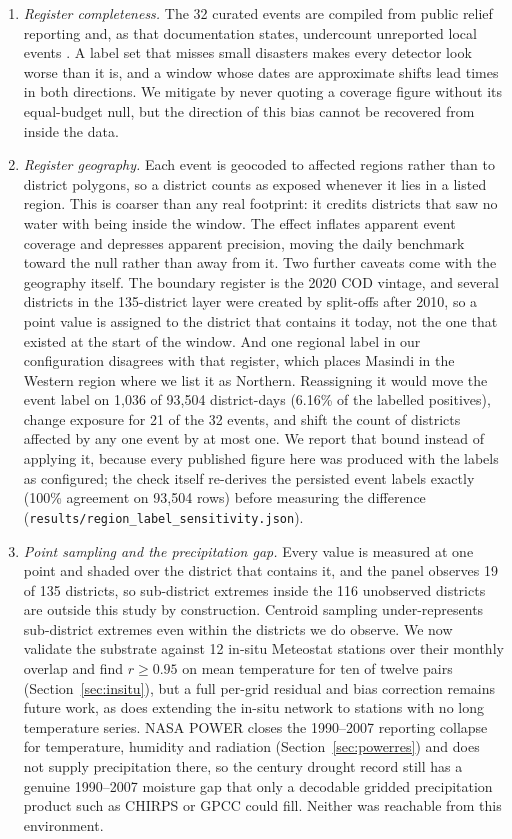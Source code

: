 \documentclass[preprint,12pt]{elsarticle}
\begin{document}
\begin{enumerate}
\item \emph{Register completeness.} The 32 curated events are compiled from public
relief reporting and, as that documentation states, undercount unreported local
events \cite{emdatdoc}. A label set that misses small disasters makes every
detector look worse than it is, and a window whose dates are approximate shifts
lead times in both directions. We mitigate by never quoting a coverage figure
without its equal-budget null, but the direction of this bias cannot be recovered
from inside the data.

\item \emph{Register geography.} Each event is geocoded to affected regions rather
than to district polygons, so a district counts as exposed whenever it lies in a
listed region. This is coarser than any real footprint: it credits districts that
saw no water with being inside the window. The effect inflates apparent event
coverage and depresses apparent precision, moving the daily benchmark toward the
null rather than away from it. Two further caveats come with the geography
itself. The boundary register is the 2020 COD vintage, and several districts in
the 135-district layer were created by split-offs after 2010, so a point value
is assigned to the district that contains it today, not the one that existed at
the start of the window. And one regional label in our configuration disagrees
with that register, which places Masindi in the Western region where we list it
as Northern. Reassigning it would move the event label on 1{,}036 of 93{,}504
district-days (6.16\% of the labelled positives), change exposure for 21 of the
32 events, and shift the count of districts affected by any one event by at most
one. We report that bound instead of applying it, because every published figure
here was produced with the labels as configured; the check itself re-derives the
persisted event labels exactly (100\% agreement on 93{,}504 rows) before
measuring the difference
(\texttt{results/region\_label\_sensitivity.json}).

\item \emph{Point sampling and the precipitation gap.} Every value is measured at
one point and shaded over the district that contains it, and the panel observes
19 of 135 districts, so sub-district extremes inside the 116 unobserved
districts are outside this study by construction. Centroid sampling
under-represents sub-district extremes even within the districts we do observe.
We now validate the substrate against 12
in-situ Meteostat stations over their monthly overlap and find $r\geq0.95$ on mean
temperature for ten of twelve pairs (Section~\ref{sec:insitu}), but a full per-grid
residual and bias correction remains future work, as does extending the in-situ
network to stations with no long temperature series. NASA POWER closes the
1990--2007 reporting collapse for temperature, humidity and radiation
(Section~\ref{sec:powerres}) and does not supply precipitation there, so the
century drought record still has a genuine 1990--2007 moisture gap that only a
decodable gridded precipitation product such as CHIRPS \cite{funk2015} or GPCC
could fill. Neither was reachable from this environment.


\end{enumerate}
\end{document}
